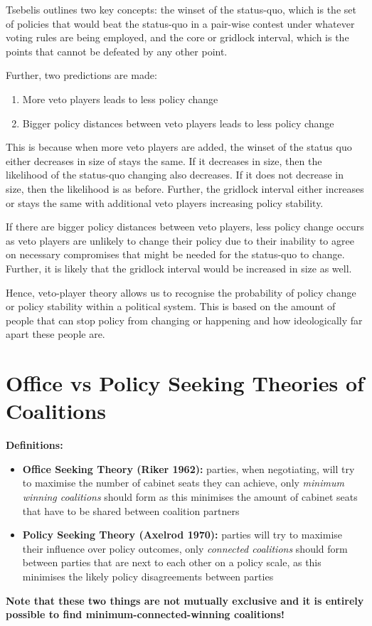 \documentclass[12pt, letterpaper]{article}
\begin{document}
Tsebelis outlines two key concepts: the winset of the status-quo, which is the set of policies that would beat the status-quo in a pair-wise contest under whatever voting rules are being employed, and the core or gridlock interval, which is the points that cannot be defeated by any other point.

Further, two predictions are made:
\begin{enumerate}
	\item More veto players leads to less policy change
	\item Bigger policy distances between veto players leads to less policy change
\end{enumerate}

This is because when more veto players are added, the winset of the status quo either decreases in size of stays the same. If it decreases in size, then the likelihood of the status-quo changing also decreases. If it does not decrease in size, then the likelihood is as before. Further, the gridlock interval either increases or stays the same with additional veto players increasing policy stability.

If there are bigger policy distances between veto players, less policy change occurs as veto players are unlikely to change their policy due to their inability to agree on necessary compromises that might be needed for the status-quo to change. Further, it is likely that the gridlock interval would be increased in size as well.

Hence, veto-player theory allows us to recognise the probability of policy change or policy stability within a political system. This is based on the amount of people that can stop policy from changing or happening and how ideologically far apart these people are.

\newpage
\section{Office vs Policy Seeking Theories of Coalitions}
\textbf{Definitions:}
\begin{itemize}
	\item \textbf{Office Seeking Theory (Riker 1962):} parties, when negotiating, will try to maximise the number of cabinet seats they can achieve, only \textit{minimum winning coalitions} should form as this minimises the amount of cabinet seats that have to be shared between coalition partners
	\item \textbf{Policy Seeking Theory (Axelrod 1970):} parties will try to maximise their influence over policy outcomes, only \textit{connected coalitions} should form between parties that are next to each other on a policy scale, as this minimises the likely policy disagreements between parties
\end{itemize}
\textbf{Note that these two things are not mutually exclusive and it is entirely possible to find minimum-connected-winning coalitions!}
\end{document}
